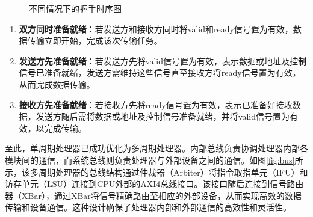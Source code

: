 \begin{figure}[htbp]
	\centering
	\caption{不同情况下的握手时序图}
	\label{fig:handshake_wave}
\end{figure}

\begin{enumerate}[label={\arabic*)}, itemsep=0pt, parsep=0pt]
	\item \textbf{双方同时准备就绪}：若发送方和接收方同时将valid和ready信号置为有效，数据传输立即开始，完成该次传输任务。
	\item \textbf{发送方先准备就绪}：若发送方先将valid信号置为有效，表示数据或地址及控制信号已准备就绪，发送方需维持这些信号直至接收方将ready信号置为有效，从而完成数据传输。
	\item \textbf{接收方先准备就绪}：若接收方先将ready信号置为有效，表示已准备好接收数据，发送方随后需将数据或地址及控制信号准备就绪，并将valid信号置为有效，以完成传输。
\end{enumerate}

至此，单周期处理器已成功优化为多周期处理器。内部总线负责协调处理器内部各模块间的通信，而系统总线则负责处理器与外部设备之间的通信。如图\ref{fig:bus}所示，该多周期处理器的总线结构通过仲裁器（Arbiter）将指令取指单元（IFU）和访存单元（LSU）连接到CPU外部的AXI4总线接口。该接口随后连接到信号路由器（XBar），通过XBar将信号精确路由至相应的外部设备，从而实现高效的数据传输和设备通信。这种设计确保了处理器内部和外部通信的高效性和灵活性。

